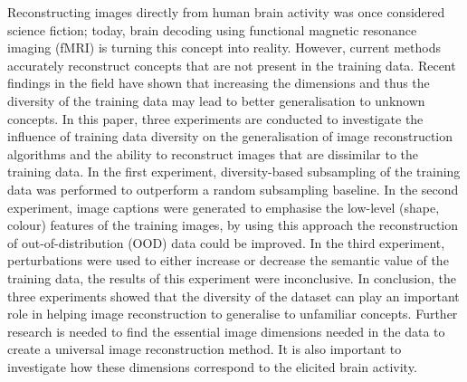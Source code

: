 %
%

\noindent{}Reconstructing images directly from human brain activity was once considered science fiction; today, brain decoding using functional magnetic resonance imaging (fMRI) is turning this concept into reality. However,  current methods  accurately reconstruct concepts that are not present in the training data. Recent findings in the field have shown that increasing the dimensions and thus the diversity of the training data may lead to better generalisation to unknown concepts. In this paper, three experiments are conducted to investigate the influence of training data diversity on the generalisation of image reconstruction algorithms and the ability to reconstruct images that are dissimilar to the training data. In the first experiment, diversity-based subsampling of the training data was performed to outperform a random subsampling baseline. In the second experiment, image captions were generated to emphasise the low-level (shape, colour) features of the training images, by using this approach the reconstruction of out-of-distribution (OOD) data could be improved. In the third experiment, perturbations were used to either increase or decrease the semantic value of the training data, the results of this experiment were inconclusive. In conclusion, the three experiments showed that the diversity of the dataset can play an important role in helping image reconstruction to generalise to unfamiliar concepts. Further research is needed to find the essential image dimensions needed in the data to create a universal image reconstruction method. It is also important to investigate how these dimensions correspond to the elicited brain activity.


